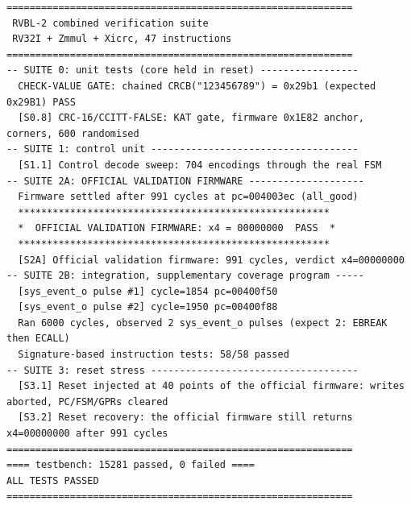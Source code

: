 \documentclass[11pt,a4paper]{article}
\begin{document}
\begin{lstlisting}[caption={The platform testbench's own output, verbatim. \texttt{SUITE 2A}
is the official validation firmware; the surrounding suites are the project's own coverage.
\texttt{SUITE 3} re-runs the official firmware after injecting reset at 40 different points
of its execution and confirms it still returns \texttt{x4=00000000}.},
label={lst:fwlog},captionpos=b]
============================================================
 RVBL-2 combined verification suite
 RV32I + Zmmul + Xicrc, 47 instructions
============================================================
-- SUITE 0: unit tests (core held in reset) -----------------
  CHECK-VALUE GATE: chained CRCB("123456789") = 0x29b1 (expected 0x29B1) PASS
  [S0.8] CRC-16/CCITT-FALSE: KAT gate, firmware 0x1E82 anchor, corners, 600 randomised
-- SUITE 1: control unit ------------------------------------
  [S1.1] Control decode sweep: 704 encodings through the real FSM
-- SUITE 2A: OFFICIAL VALIDATION FIRMWARE --------------------
  Firmware settled after 991 cycles at pc=004003ec (all_good)
  ******************************************************
  *  OFFICIAL VALIDATION FIRMWARE: x4 = 00000000  PASS  *
  ******************************************************
  [S2A] Official validation firmware: 991 cycles, verdict x4=00000000
-- SUITE 2B: integration, supplementary coverage program -----
  [sys_event_o pulse #1] cycle=1854 pc=00400f50
  [sys_event_o pulse #2] cycle=1950 pc=00400f88
  Ran 6000 cycles, observed 2 sys_event_o pulses (expect 2: EBREAK then ECALL)
  Signature-based instruction tests: 58/58 passed
-- SUITE 3: reset stress ------------------------------------
  [S3.1] Reset injected at 40 points of the official firmware: writes aborted, PC/FSM/GPRs cleared
  [S3.2] Reset recovery: the official firmware still returns x4=00000000 after 991 cycles
============================================================
==== testbench: 15281 passed, 0 failed ====
ALL TESTS PASSED
============================================================
\end{lstlisting}
\end{document}
